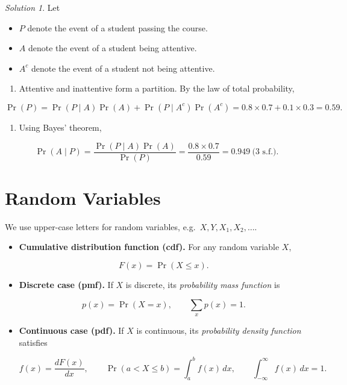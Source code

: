 \documentclass[
  letterpaper,
  DIV=11,
  numbers=noendperiod]{scrreprt}
\providecommand{\tightlist}{%
  \setlength{\itemsep}{0pt}\setlength{\parskip}{0pt}}
\theoremstyle{definition}
\theoremstyle{plain}
\theoremstyle{definition}
\theoremstyle{remark}
\newtheorem{refsolution}{Solution}[chapter]
\begin{document}
\begin{refsolution}
Let

\begin{itemize}
\tightlist
\item
  \(P\) denote the event of a student passing the course.
\item
  \(A\) denote the event of a student being attentive.
\item
  \(A^c\) denote the event of a student not being attentive.
\end{itemize}

\begin{enumerate}
\def\labelenumi{\arabic{enumi}.}
\tightlist
\item
  Attentive and inattentive form a partition. By the law of total
  probability,
\end{enumerate}

\[
\Pr(P)=\Pr(P\mid A)\Pr(A)+\Pr(P\mid A^c)\Pr(A^c)=0.8\times0.7+0.1\times0.3=0.59.
\]

\begin{enumerate}
\def\labelenumi{\arabic{enumi}.}
\setcounter{enumi}{1}
\tightlist
\item
  Using Bayes' theorem,
\end{enumerate}

\[
\Pr(A\mid P)=\frac{\Pr(P\mid A)\Pr(A)}{\Pr(P)}
=\frac{0.8\times0.7}{0.59}=0.949\ \text{(3 s.f.)}.
\]

\label{sol-student}

\end{refsolution}

\section{Random Variables}\label{random-variables}

We use upper-case letters for random variables,
e.g.~\(X, Y, X_1, X_2,\dots\).

\begin{itemize}
\item
  \textbf{Cumulative distribution function (cdf).} For any random
  variable \(X\),

  \[
  F(x)=\Pr(X\le x).
  \]
\item
  \textbf{Discrete case (pmf).} If \(X\) is discrete, its
  \emph{probability mass function} is

  \[
  p(x)=\Pr(X=x),\qquad \sum_x p(x)=1.
  \]
\item
  \textbf{Continuous case (pdf).} If \(X\) is continuous, its
  \emph{probability density function} satisfies

  \[
  f(x)=\frac{dF(x)}{dx},\qquad \Pr(a<X\le b)=\int_a^b f(x)\,dx,\qquad \int_{-\infty}^{\infty} f(x)\,dx=1.
  \]
\end{itemize}
\end{document}
